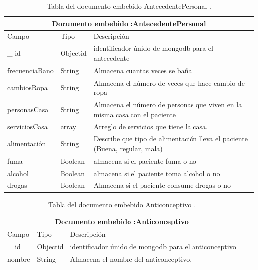 \begin{table}[htb]
	\centering
	\begin{tabular}{| p{3.5cm}| p{3.0cm} | p{9.8cm} |}
	\hline
	\multicolumn{3}{|c|}{Documento embebido :AntecedentePersonal} \\
	\hline
	Campo & Tipo &  Descripción\\ \hline
	
	\_ id & Objectid &identificador únido de mongodb para el antecedente \\ \hline
	
	frecuenciaBano & String & Almacena cuantas veces se baña  \\ \hline
	
	cambiosRopa &  String & Almacena el número de veces que hace cambio de ropa\\ \hline
	
	personasCasa & String & Almacena el número de personas que viven en la misma casa con el paciente \\ \hline
	
	serviciosCasa & array & Arreglo de servicios que tiene la casa. \\ \hline
	
	alimentación & String & Describe que tipo de alimentación lleva el paciente (Buena, regular, mala)\\ \hline
	
	fuma & Boolean & almacena si el paciente fuma o no\\ \hline
	
	alcohol & Boolean  & almacena si el paciente toma alcohol o no \\ \hline
	
	drogas & Boolean & Almacena si el paciente consume drogas o no \\ \hline
	
	\end{tabular}
	\caption{Tabla del documento embebido AntecedentePersonal .}
	\label{tabla:diccionarioDatos}
	\end{table}
	
	
	\begin{table}[htb]
	\centering
	\begin{tabular}{| p{3.5cm}| p{3.0cm} | p{9.8cm} |}
	\hline
	\multicolumn{3}{|c|}{Documento embebido :Anticonceptivo} \\
	\hline
	Campo & Tipo &  Descripción\\ \hline
	
	\_ id & Objectid &identificador únido de mongodb para el anticonceptivo \\ \hline
	
	nombre & String & Almacena el nombre del anticonceptivo.

	\end{tabular}
	\caption{Tabla del documento embebido Anticonceptivo .}
	\label{tabla:diccionarioDatos}
	\end{table}



